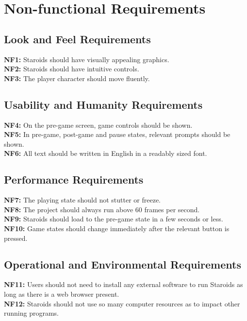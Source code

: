 \documentclass[12pt, titlepage]{article}
\begin{document}
\section{Non-functional Requirements}

\subsection{Look and Feel Requirements}
    \textbf{NF1:} Staroids should have visually appealing graphics.\\
    \textbf{NF2:} Staroids should have intuitive controls.\\
    \textbf{NF3:} The player character should move fluently.\\

\subsection{Usability and Humanity Requirements}
    \textbf{NF4:} On the pre-game screen, game controls should be shown.\\
    \textbf{NF5:} In pre-game, post-game and pause states, relevant prompts should be shown.\\
    \textbf{NF6:} All text should be written in English in a readably sized font.\\

\subsection{Performance Requirements}
    \textbf{NF7:} The playing state should not stutter or freeze.\\
    \textbf{NF8:} The project should always run above 60 frames per second.\\
    \textbf{NF9:} Staroids should load to the pre-game state in a few seconds or less.\\
    \textbf{NF10:} Game states should change immediately after the relevant button is pressed.\\

\subsection{Operational and Environmental Requirements}
    \textbf{NF11:} Users should not need to install any external software to run Staroids as long as there is a web browser present.\\
    \textbf{NF12:} Staroids should not use so many computer resources as to impact other running programs.\\
\end{document}
